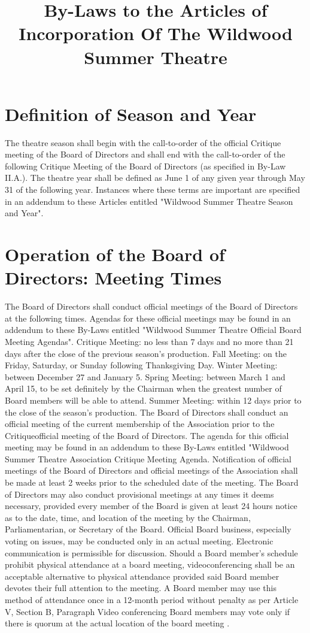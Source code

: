\documentclass{article}
\title{By-Laws to the Articles of Incorporation Of The Wildwood Summer Theatre}
\begin{document}
\maketitle

\section{Definition of Season and Year}
\1 The theatre season shall begin with the call-to-order of the official Critique meeting of the Board of Directors and shall end with the call-to-order of the following Critique Meeting of the Board of Directors (as specified in By-Law II.A.).
\1 The theatre year shall be defined as June 1 of any given year through May 31 of the following year.
\1 Instances where these terms are important are specified in an addendum to these Articles entitled "Wildwood Summer Theatre Season and Year".

\section{Operation of the Board of Directors: Meeting Times}
\1 The Board of Directors shall conduct official meetings of the Board of Directors at the following times.  Agendas for these official meetings may be found in an addendum to these By-Laws entitled "Wildwood Summer Theatre Official Board Meeting Agendas".
\2 Critique Meeting: no less than 7 days and no more than 21 days after the close of the previous season's production.
\2 Fall Meeting: on the Friday, Saturday, or Sunday following Thanksgiving Day.
\2 Winter Meeting: between December 27 and January 5.
\2 Spring Meeting: between March 1 and April 15, to be set definitely by the Chairman when the greatest number of Board members will be able to attend.
\2 Summer Meeting: within 12 days prior to the close of the season's production.
\1 The Board of Directors shall conduct an official meeting of the current membership of the Association prior to the Critiqueofficial meeting of the Board of Directors.  The agenda for this official meeting may be found in an addendum to these By-Laws entitled "Wildwood Summer Theatre Association Critique Meeting Agenda.
\1 Notification of official meetings of the Board of Directors and official meetings of the Association shall be made at least 2 weeks prior to the scheduled date of the meeting.
\1 The Board of Directors may also conduct provisional meetings at any times it deems necessary, provided every member of the Board is given at least 24 hours notice as to the date, time, and location of the meeting by the Chairman, Parliamentarian, or Secretary of the Board.
\1 Official Board business, especially voting on issues, may be conducted only in an actual meeting.  Electronic communication is permissible for discussion.
\2 Should a Board member’s  schedule prohibit physical attendance at a board meeting, videoconferencing shall be an acceptable alternative to physical attendance provided said Board member devotes their full attention to the meeting. A Board member may use this method of attendance once in a 12-month period without penalty as per Article V, Section B, Paragraph
\3 Video conferencing Board members may vote only if there is quorum at the actual location of the board meeting .  
\end{document}
